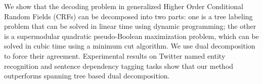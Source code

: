 We show that the decoding problem in generalized Higher Order Conditional Random Fields (CRFs) can be decomposed into two parts: one is a tree labeling problem that can be solved in linear time using dynamic programming; the other is a supermodular quadratic pseudo-Boolean maximization problem, which can be solved in cubic time using a minimum cut algorithm. We use dual decomposition to force their agreement. Experimental results on Twitter named entity recognition and sentence dependency tagging tasks show that our method outperforms spanning tree based dual decomposition.